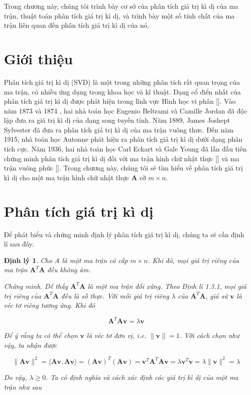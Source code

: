 \documentclass[12pt,a4paper,oneside]{report}
\newtheorem{dl}{Định lý}[section]
\numberwithin{equation}{section}
\begin{document}
Trong chương này, chúng tôi trình bày cơ sở của phân tích giá trị kì dị của ma trận, thuật toán phân tích giá trị kì dị, và trình bày một số tính chất của ma trận liên quan đến phân tích giá trị kì dị của nó. 
\section{Giới thiệu}
Phân tích giá trị kì dị (SVD) là một trong những phân tích rất quan trọng của ma trận, có nhiều ứng dụng trong khoa học và kĩ thuật. Dạng cổ điển nhất của phân tích giá trị kì dị được phát hiện trong lĩnh vực Hình học vi phân []. Vào năm 1873 và 1874 , hai nhà toán học Eugenio Beltrami và Camille Jordan đã độc lập đưa ra giá trị kì dị của dạng song tuyến tính. Năm 1889, James Joshept Sylvester đã đưa ra phân tích giá trị kì dị của ma trận vuông thưc. Đến năm 1915, nhà toán học Autonne phát hiện ra phân tích giá trị kì dị dưới dạng phân tích cực. Năm 1936, hai nhà toán học Carl Eckart và Gale Young đã lần đầu tiên chứng minh phân tích giá trị kì dị đối với ma trận hình chữ nhật thực [] và ma trận vuông phức []. Trong chương này, chúng tôi sẽ tìm hiểu về phân tích giá trị kì dị cho một ma trận hình chữ nhật thực $\mathbf{A}$ cỡ $m \times n$.
\section{Phân tích giá trị kì dị}
Để phát biểu và chứng minh định lý phân tích giá trị kì dị, chúng ta sẽ cần định lí sau đây.

\begin{dl} Cho A là một ma trận có cấp $m \times n$. Khi đó, mọi giá trị riêng của ma trận $\mathbf{A}^{T} \mathbf{A}$ đều không âm.

Chứng minh. Dễ thấy $\mathbf{A}^{T} \mathbf{A}$ là một ma trận đối xứng. Theo Định lí 1.3.1, mọi giá trị riêng của $\mathbf{A}^{T} \mathbf{A}$ đều là số thực. Với mỗi giá trị riêng $\lambda$ của $\mathbf{A}^{T} \mathbf{A}$, giả sử $\mathbf{v}$ là véc tơ riêng tương ứng. Khi đó

$$
\mathbf{A}^{T} \mathbf{A} \mathbf{v}=\lambda \mathbf{v}
$$

Để ý rằng ta có thể chọn $\mathbf{v}$ là véc tơ đơn vị, i.e. $\|\mathbf{v}\|=1$. Với cách chọn như vậy, ta nhận được

$$
\|\mathbf{A} \mathbf{v}\|^{2}=\langle\mathbf{A} \mathbf{v}, \mathbf{A v}\rangle=(\mathbf{A v})^{T}(\mathbf{A v})=\mathbf{v}^{T} \mathbf{A}^{T} \mathbf{A} \mathbf{v}=\lambda \mathbf{v}^{T} \mathbf{v}=\lambda\|\mathbf{v}\|^{2}=\lambda
$$

Do vậy, $\lambda \geqslant 0$.
Ta có định nghĩa và cách xác định các giá trị kì dị của một ma trận như sau
\end{dl}
\end{document}
